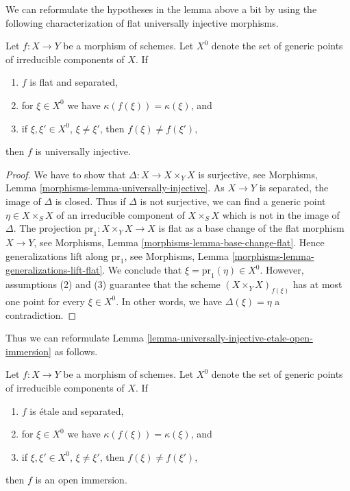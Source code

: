 \noindent
We can reformulate the hypotheses in the lemma above a bit by using the
following characterization of flat universally injective morphisms.

\begin{lemma}
\label{lemma-flat-universally-injective}
Let $f : X \to Y$ be a morphism of schemes. Let $X^0$ denote the set
of generic points of irreducible components of $X$. If
\begin{enumerate}
\item $f$ is flat and separated,
\item for $\xi \in X^0$ we have $\kappa(f(\xi)) = \kappa(\xi)$, and
\item if $\xi, \xi' \in X^0$, $\xi \not = \xi'$, then $f(\xi) \not = f(\xi')$,
\end{enumerate}
then $f$ is universally injective.
\end{lemma}

\begin{proof}
We have to show that $\Delta : X \to X \times_Y X$ is surjective, see
Morphisms, Lemma \ref{morphisms-lemma-universally-injective}.
As $X \to Y$ is separated, the image of $\Delta$ is closed.
Thus if $\Delta$ is not surjective, we can find a generic point
$\eta \in X \times_S X$ of an irreducible component of $X \times_S X$
which is not in the image of $\Delta$. The projection
$\text{pr}_1 : X \times_Y X \to X$
is flat as a base change of the flat morphism $X \to Y$, see
Morphisms, Lemma \ref{morphisms-lemma-base-change-flat}.
Hence generalizations lift along $\text{pr}_1$, see
Morphisms, Lemma \ref{morphisms-lemma-generalizations-lift-flat}.
We conclude that $\xi = \text{pr}_1(\eta) \in X^0$.
However, assumptions (2) and (3) guarantee that the scheme
$(X \times_Y X)_{f(\xi)}$ has at most one point for every $\xi \in X^0$.
In other words, we have $\Delta(\xi) = \eta$ a contradiction.
\end{proof}

\noindent
Thus we can reformulate
Lemma \ref{lemma-universally-injective-etale-open-immersion} as follows.

\begin{lemma}
\label{lemma-characterize-open-immersion}
Let $f : X \to Y$ be a morphism of schemes. Let $X^0$ denote the set
of generic points of irreducible components of $X$. If
\begin{enumerate}
\item $f$ is \'etale and separated,
\item for $\xi \in X^0$ we have $\kappa(f(\xi)) = \kappa(\xi)$, and
\item if $\xi, \xi' \in X^0$, $\xi \not = \xi'$, then $f(\xi) \not = f(\xi')$,
\end{enumerate}
then $f$ is an open immersion.
\end{lemma}

